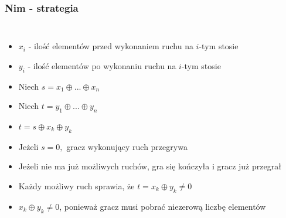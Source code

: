\documentclass[polish,envcountsect,10pt]{beamer}
\begin{document}
                \begin{frame}
                    \frametitle{Nim - strategia}
                    \begin{columns}
                            \begin{itemize}
                                \item<1-> $x_i$ - ilość elementów przed wykonaniem ruchu na $i$-tym stosie
                                \item<1-> $y_i$ - ilość elementów po wykonaniu ruchu na $i$-tym stosie
                                \item<1-> Niech $s = x_1 \oplus ... \oplus x_n$
                                \item<1-> Niech $t = y_1 \oplus ... \oplus y_n$
                                \item<1-> $t = s \oplus x_k \oplus y_k$
                                \item<2-> Jeżeli $s = 0,$ gracz wykonujący ruch przegrywa
                                \item<3-> Jeżeli nie ma już możliwych ruchów, gra się kończyła i gracz już przegrał
                                \item<4-> Każdy możliwy ruch sprawia, że $t = x_k \oplus y_k \neq 0$
                                \item<5-> $x_k \oplus y_k \neq 0$, ponieważ gracz musi pobrać niezerową liczbę elementów
                            \end{itemize}
                    \end{columns}
                \end{frame}
\end{document}
